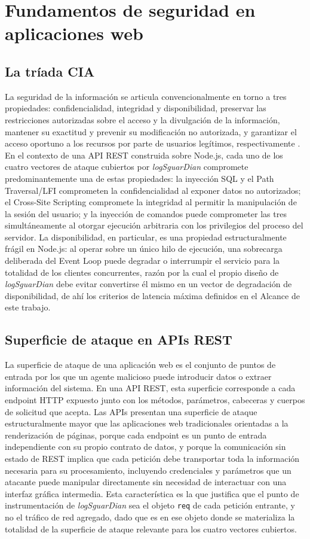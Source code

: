 \section{Fundamentos de seguridad en aplicaciones web}

\subsection{La tríada CIA}
La seguridad de la información se articula convencionalmente en torno a tres propiedades:
confidencialidad, integridad y disponibilidad, preservar las restricciones autorizadas sobre el acceso y la divulgación de la información, mantener
su exactitud y prevenir su modificación no autorizada, y
garantizar el acceso oportuno a los recursos por parte de usuarios legítimos, respectivamente \cite{nistinfosec2026}. En el contexto de una API REST construida sobre Node.js, cada uno de los cuatro
vectores de ataque cubiertos por \textit{logSguarDian} compromete predominantemente una de
estas propiedades: la inyección SQL y el Path Traversal/LFI comprometen la confidencialidad al
exponer datos no autorizados; el Cross-Site Scripting compromete la integridad al permitir la
manipulación de la sesión del usuario; y la inyección de comandos puede comprometer las tres
simultáneamente al otorgar ejecución arbitraria con los privilegios del proceso del servidor. La
disponibilidad, en particular, es una propiedad estructuralmente frágil en Node.js: al operar sobre
un único hilo de ejecución, una sobrecarga deliberada del Event Loop puede degradar o
interrumpir el servicio para la totalidad de los clientes concurrentes, razón por la cual el propio
diseño de \textit{logSguarDian} debe evitar convertirse él mismo en un vector de degradación de
disponibilidad, de ahí los criterios de latencia máxima definidos en el Alcance de este trabajo.

\subsection{Superficie de ataque en APIs REST}
La superficie de ataque de una aplicación web es el conjunto de puntos de entrada por los que un
agente malicioso puede introducir datos o extraer información del sistema. En una API REST, esta
superficie corresponde a cada endpoint HTTP expuesto junto con los métodos, parámetros,
cabeceras y cuerpos de solicitud que acepta. Las APIs presentan una superficie de ataque
estructuralmente mayor que las aplicaciones web tradicionales orientadas a la renderización de
páginas, porque cada endpoint es un punto de entrada independiente con su propio contrato de
datos, y porque la comunicación sin estado de REST implica que cada petición debe transportar
toda la información necesaria para su procesamiento, incluyendo credenciales y parámetros que un
atacante puede manipular directamente sin necesidad de interactuar con una interfaz gráfica
intermedia. Esta característica es la que justifica que el punto de instrumentación de
\textit{logSguarDian} sea el objeto \texttt{req} de cada petición entrante, y no el tráfico de red
agregado, dado que es en ese objeto donde se materializa la totalidad de la superficie de ataque
relevante para los cuatro vectores cubiertos.

